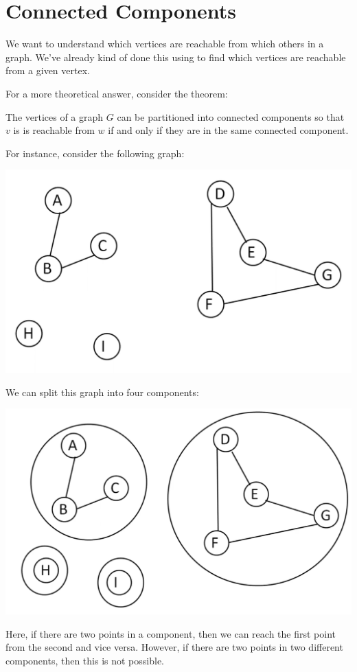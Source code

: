 \documentclass[letterpaper]{article}
\begin{document}
\section{Connected Components}
We want to understand which vertices are reachable from which others in a graph. We've already kind of done this using  to find which vertices are reachable from a given vertex. 

\bigskip 

For a more theoretical answer, consider the theorem: 
\begin{theorem}{}{}
    The vertices of a graph $G$ can be partitioned into connected components so that $v$ is is reachable from $w$ if and only if they are in the same connected component. 
\end{theorem}

For instance, consider the following graph:
\begin{center}
    \includegraphics[scale=0.35]{../assets/graph_con.png}
\end{center}
We can split this graph into four components: 
\begin{center}
    \includegraphics[scale=0.35]{../assets/graph_con_2.png}
\end{center}
Here, if there are two points in a component, then we can reach the first point from the second and vice versa. However, if there are two points in two different components, then this is not possible.  
\end{document}
